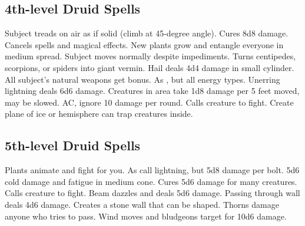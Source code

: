 \subsection{4th-level Druid Spells}
\begin{spelllist}
   Subject treads on air as if solid (climb at 45-degree angle).
   Cures 8d8 damage.
   Cancels spells and magical effects.
   New plants grow and entangle everyone in medium spread.
   Subject moves normally despite impediments.
   Turns centipedes, scorpions, or spiders into giant vermin.
   Hail deals 4d4 damage in small cylinder.
   All subject's natural weapons get  bonus.
   As , but all energy types.
   Unerring lightning deals 6d6 damage.
   Creatures in area take 1d8 damage per 5 feet moved, may be slowed.
    AC, ignore 10 damage per round.
   Calls creature to fight.
   Create plane of ice or hemisphere can trap creatures inside.
\end{spelllist}

\subsection{5th-level Druid Spells}
\begin{spelllist}
   Plants animate and fight for you.
   As call lightning, but 5d8 damage per bolt.
   5d6 cold damage and fatigue in medium cone.
   Cures 5d6 damage for many creatures.
   Calls creature to fight.
   Beam dazzles and deals 5d6 damage.
   Passing through wall deals 4d6 damage.
   Creates a stone wall that can be shaped.
   Thorns damage anyone who tries to pass.
   Wind moves and bludgeons target for 10d6 damage.
\end{spelllist}

